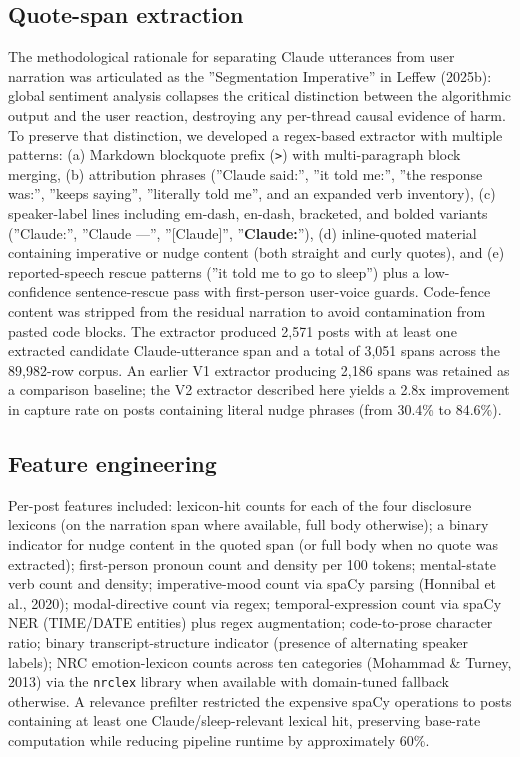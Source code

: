 \documentclass{obelus-preprint}
\begin{document}
\subsection{Quote-span extraction}
The methodological rationale for separating Claude utterances from user narration was articulated as the ''Segmentation Imperative'' in Leffew (2025b): global sentiment analysis collapses the critical distinction between the algorithmic output and the user reaction, destroying any per-thread causal evidence of harm. To preserve that distinction, we developed a regex-based extractor with multiple patterns: (a) Markdown blockquote prefix (\texttt{>}) with multi-paragraph block merging, (b) attribution phrases (''Claude said:'', ''it told me:'', ''the response was:'', ''keeps saying'', ''literally told me'', and an expanded verb inventory), (c) speaker-label lines including em-dash, en-dash, bracketed, and bolded variants (''Claude:'', ''Claude ---'', ''[Claude]'', ''\textbf{Claude:}''), (d) inline-quoted material containing imperative or nudge content (both straight and curly quotes), and (e) reported-speech rescue patterns (''it told me to go to sleep'') plus a low-confidence sentence-rescue pass with first-person user-voice guards. Code-fence content was stripped from the residual narration to avoid contamination from pasted code blocks. The extractor produced 2,571 posts with at least one extracted candidate Claude-utterance span and a total of 3,051 spans across the 89,982-row corpus. An earlier V1 extractor producing 2,186 spans was retained as a comparison baseline; the V2 extractor described here yields a 2.8x improvement in capture rate on posts containing literal nudge phrases (from 30.4\% to 84.6\%).
\subsection{Feature engineering}
Per-post features included: lexicon-hit counts for each of the four disclosure lexicons (on the narration span where available, full body otherwise); a binary indicator for nudge content in the quoted span (or full body when no quote was extracted); first-person pronoun count and density per 100 tokens; mental-state verb count and density; imperative-mood count via spaCy parsing (Honnibal et al., 2020); modal-directive count via regex; temporal-expression count via spaCy NER (TIME/DATE entities) plus regex augmentation; code-to-prose character ratio; binary transcript-structure indicator (presence of alternating speaker labels); NRC emotion-lexicon counts across ten categories (Mohammad \& Turney, 2013) via the \texttt{nrclex} library when available with domain-tuned fallback otherwise.
A relevance prefilter restricted the expensive spaCy operations to posts containing at least one Claude/sleep-relevant lexical hit, preserving base-rate computation while reducing pipeline runtime by approximately 60\%.
\end{document}
